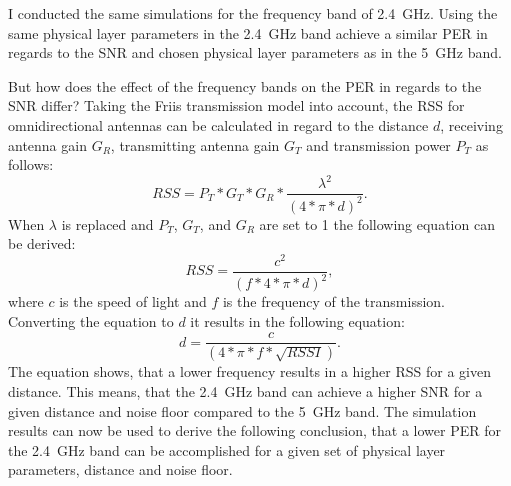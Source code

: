 I conducted the same simulations for the frequency band of \SI{2.4}{\giga\hertz}. Using the same physical layer parameters in
the \SI{2.4}{\giga\hertz} band achieve a similar \ac{PER} in regards to the \ac{SNR} and chosen physical layer parameters
as in the \SI{5}{\giga\hertz} band.

But how does the effect of the frequency bands on the \ac{PER} in regards to the \ac{SNR} differ?
Taking the Friis transmission model \cite{shaw_radiometry_2013} into account, the \ac{RSS} for omnidirectional antennas can be calculated in regard to the distance $d$,
receiving antenna gain $G_{R}$, transmitting antenna gain $G_{T}$ and transmission power $P_{T}$  as follows:
\begin{equation}
	RSS = P_{T} * G_{T} * G_{R} * \frac{\lambda^2}{(4 * \pi * d)^2}.
\end{equation}
When $\lambda$ is replaced and  $P_{T}$,  $G_{T}$,  and $G_{R}$ are set to \num{1} the following equation can be derived:
\begin{equation}
	RSS = \frac{c^2}{(f* 4 * \pi * d)^2},
\end{equation}
where $c$ is the speed of light and $f$ is the frequency of the transmission.
Converting the equation to $d$ it results in the following equation:
\begin{equation}
	d = \frac{c}{(4 * \pi * f * \sqrt {RSSI})}.
\end{equation}
The equation shows, that a lower frequency results in a higher \ac{RSS} for a given distance.
This means, that the \SI{2.4}{\giga\hertz} band can achieve a higher \ac{SNR} for a given distance and noise floor
compared to the \SI{5}{\giga\hertz} band.
The simulation results can now be used to derive the following conclusion,
that a lower \ac{PER} for the \SI{2.4}{\giga\hertz} band can be accomplished
for a given set of physical layer parameters, distance and noise floor.


